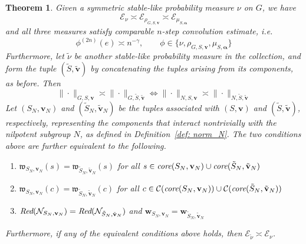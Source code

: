 \documentclass[pdflatex,sn-mathphys-num]{sn-jnl}%
\theoremstyle{thmstyleone}%
\newtheorem{theo}{Theorem}%
\theoremstyle{thmstyletwo}%
\theoremstyle{thmstylethree}%
\begin{document}
\begin{theo}
\label{thm: main2}
    Given a symmetric stable-like probability measure $\nu$ on $G$, we have 
    $$\mathcal{E}_{\nu} \asymp \mathcal{E}_{\rho_{G, S,\mathbf v}} \asymp \mathcal{E}_{\mu_{S, \bm{\alpha}}}$$
    and all three measures satisfy comparable $n$-step convolution estimate, i.e. 
    $$\phi^{(2n)}(e) \asymp n^{-\gamma}, \qquad \phi \in \{\nu, \rho_{G, S,\mathbf v}, \mu_{S, \bm{\alpha}}\}$$
Furthermore, let $\tilde{\nu}$ be another stable-like probability measure in the collection, and form the tuple
$(\tilde{S}, \tilde{\mathbf{v}})$ by concatenating the tuples arising from its components, as before. Then 
$$\|\cdot\|_{G,S,\mathbf{v}}\asymp \|\cdot \|_{G,\tilde{S}, \tilde{\mathbf{v}}} \Longleftrightarrow \|\cdot\|_{N,S,\mathbf{v}}\asymp \|\cdot \|_{N,\tilde{S}, \tilde{\mathbf{v}}}  $$
Let $(S_N,\mathbf{v}_N)$ and $(\tilde{S}_N,\tilde{\mathbf{v}}_N)$ be the tuples associated with $(S,\mathbf{v})$ and $(\tilde{S},\tilde{\mathbf{v}})$, respectively, representing the components that interact nontrivially with the nilpotent subgroup $N$, as defined in Definition~\ref{def: norm_N}. The two conditions above are further equivalent to the following.
\begin{enumerate}
        \item $\mathfrak w_{S_N,\mathbf{v}_N}(s)=\mathfrak w_{\tilde{S}_N,\tilde{\mathbf{v}}_N}(s)$ for all $
s \in \mbox{\em core}(S_N,\mathbf{v}_N) \cup \mbox{\em core}(\tilde{S}_N,\tilde{\mathbf{v}}_N)$ 
    \item $\mathfrak w_{S_N,\mathbf{v}_N}(c)=\mathfrak w_{\tilde{S}_N,\tilde{\mathbf{v}}_N}(c)$ for all $
 c\in\mathcal{C}(\mbox{\em core}(S_N,\mathbf{v}_N)) \cup \mathcal{C}(\mbox{\em core}(\tilde{S}_N,\tilde{\mathbf{v}}_N))$ 
\item  $\mbox{\em Red}(\mathcal{N}_{S_N,\mathbf{v}_N}) = \mbox{\em Red}(\mathcal{N}_{\tilde{S}_N,\tilde{\mathbf{v}}_N})$  and $\mathbf{w}_{S_N,\mathbf{v}_N} = \mathbf{w}_{\tilde{S}_N,\tilde{\mathbf{v}}_N} $
\end{enumerate}
 Furthermore, if any of the equivalent conditions above holds, then  $\mathcal E_{\tilde{\nu}}\asymp\mathcal E_\nu$.  
\end{theo}
\end{document}

